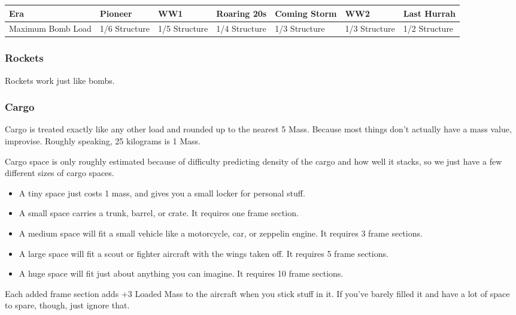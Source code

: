 \documentclass{article}
\begin{document}
\begin{tabular}{|l|l|l|l|l|l|l|}
    \hline
    Era               & Pioneer       & WW1           & Roaring 20s   & Coming Storm & WW2 & Last Hurrah \\\hline
    Maximum Bomb Load & 1/6 Structure & 1/5 Structure & 1/4 Structure & 1/3
    Structure         & 1/3 Structure & 1/2 Structure                                                    \\\hline
\end{tabular}

\subsubsection{Rockets}
\label{_Rockets}

Rockets work just like bombs.

\subsubsection{Cargo}
\label{_Cargo}

Cargo is treated exactly like any other load and rounded up to the
nearest 5 Mass. Because most things don't actually have a mass value,
improvise. Roughly speaking, 25 kilograms is 1 Mass.

Cargo space is only roughly estimated because of difficulty predicting
density of the cargo and how well it stacks, so we just have a few
different sizes of cargo spaces.

\begin{itemize}
    \item          A tiny space just costs 1 mass, and gives you a small locker
          for personal stuff.
    \item          A small space carries a trunk, barrel, or crate. It requires
          one frame section.
    \item          A medium space will fit a small vehicle like a motorcycle, car,
          or zeppelin engine. It requires 3 frame sections.
    \item          A large space will fit a scout or fighter aircraft with the
          wings taken off. It requires 5 frame sections.
    \item          A huge space will fit just about anything you can imagine. It
          requires 10 frame sections.
\end{itemize}

Each added frame section adds +3 Loaded Mass to the aircraft when you
stick stuff in it. If you've barely filled it and have a lot of space to
spare, though, just ignore that.
\end{document}
